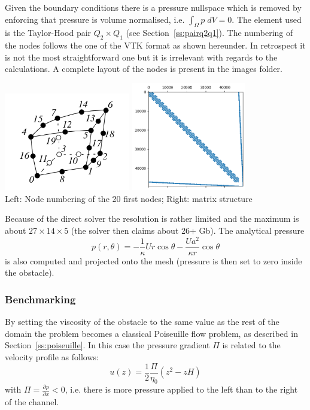 Given the boundary conditions there is a pressure nullspace which is 
removed by enforcing that pressure is volume normalised, i.e. $\int_\Omega p \; dV=0$. The element used is the 
Taylor-Hood pair $Q_2\times Q_1$ (see Section~\ref{ss:pairq2q1}).
The numbering of the nodes follows the one of the VTK format as shown hereunder. 
In retrospect it is not the most straightforward one but it is irrelevant with regards 
to the calculations. A complete layout of the nodes is present in the images folder. 

\begin{center}
\includegraphics[width=5.5cm]{python_codes/fieldstone_109/images/numbering}
\includegraphics[width=5cm]{python_codes/fieldstone_109/images/matrix}\\
{\captionfont Left: Node numbering of the 20 first nodes; Right: matrix structure}
\end{center}

Because of the direct solver the resolution is rather limited and the maximum is 
about $27\times 14 \times 5$ (the solver then claims about 26+ Gb). The analytical pressure  
\[
p(r,\theta) = 
-\frac{1}{\kappa} U r  \cos \theta
 -\frac{U a^2 }{\kappa r}  \cos \theta
\]
is also computed and projected onto the mesh (pressure is then set to zero inside the 
obstacle). 

\subsubsection*{Benchmarking}

By setting the viscosity of the obstacle to the same value as the rest 
of the domain the problem becomes a classical Poiseuille flow problem, as 
described in Section~\ref{ss:poiseuille}.
In this case the pressure gradient $\Pi$ is related to the velocity profile 
as follows:
\[
u(z) = \frac{1}{2}\frac{\Pi}{\eta_0} (z^2 - zH)
\]
with $\Pi=\frac{\partial p}{\partial x}<0$, i.e. 
there is more pressure applied to the left than to the right of the channel.

